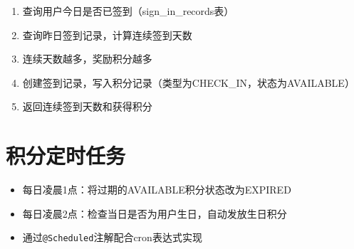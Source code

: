 \begin{enumerate}
	\item 查询用户今日是否已签到（sign\_in\_records表）
	\item 查询昨日签到记录，计算连续签到天数
	\item 连续天数越多，奖励积分越多
	\item 创建签到记录，写入积分记录（类型为CHECK\_IN，状态为AVAILABLE）
	\item 返回连续签到天数和获得积分
\end{enumerate}

\section{积分定时任务}

\begin{itemize}
	\item 每日凌晨1点：将过期的AVAILABLE积分状态改为EXPIRED
	\item 每日凌晨2点：检查当日是否为用户生日，自动发放生日积分
	\item 通过\verb|@Scheduled|注解配合cron表达式实现
\end{itemize}
